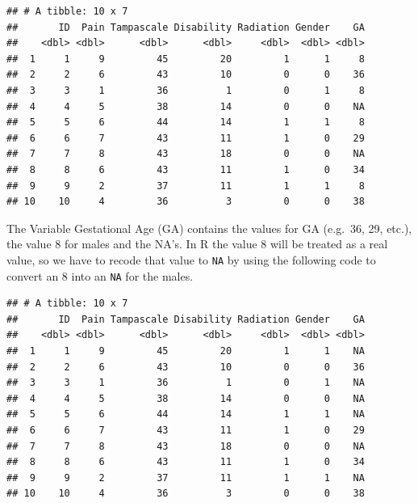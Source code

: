 \documentclass[]{book}
\newenvironment{Shaded}{\begin{snugshade}}{\end{snugshade}}
\newcommand{\KeywordTok}[1]{\textcolor[rgb]{0.13,0.29,0.53}{\textbf{#1}}}
\newcommand{\DecValTok}[1]{\textcolor[rgb]{0.00,0.00,0.81}{#1}}
\newcommand{\StringTok}[1]{\textcolor[rgb]{0.31,0.60,0.02}{#1}}
\newcommand{\OtherTok}[1]{\textcolor[rgb]{0.56,0.35,0.01}{#1}}
\newcommand{\OperatorTok}[1]{\textcolor[rgb]{0.81,0.36,0.00}{\textbf{#1}}}
\newcommand{\NormalTok}[1]{#1}
\begin{document}
\begin{verbatim}
## # A tibble: 10 x 7
##       ID  Pain Tampascale Disability Radiation Gender    GA
##    <dbl> <dbl>      <dbl>      <dbl>     <dbl>  <dbl> <dbl>
##  1     1     9         45         20         1      1     8
##  2     2     6         43         10         0      0    36
##  3     3     1         36          1         0      1     8
##  4     4     5         38         14         0      0    NA
##  5     5     6         44         14         1      1     8
##  6     6     7         43         11         1      0    29
##  7     7     8         43         18         0      0    NA
##  8     8     6         43         11         1      0    34
##  9     9     2         37         11         1      1     8
## 10    10     4         36          3         0      0    38
\end{verbatim}

The Variable Gestational Age (GA) contains the values for GA (e.g.~36,
29, etc.), the value 8 for males and the NA's. In R the value 8 will be
treated as a real value, so we have to recode that value to \texttt{NA}
by using the following code to convert an 8 into an \texttt{NA} for the
males.

\begin{Shaded}
\end{Shaded}

\begin{verbatim}
## # A tibble: 10 x 7
##       ID  Pain Tampascale Disability Radiation Gender    GA
##    <dbl> <dbl>      <dbl>      <dbl>     <dbl>  <dbl> <dbl>
##  1     1     9         45         20         1      1    NA
##  2     2     6         43         10         0      0    36
##  3     3     1         36          1         0      1    NA
##  4     4     5         38         14         0      0    NA
##  5     5     6         44         14         1      1    NA
##  6     6     7         43         11         1      0    29
##  7     7     8         43         18         0      0    NA
##  8     8     6         43         11         1      0    34
##  9     9     2         37         11         1      1    NA
## 10    10     4         36          3         0      0    38
\end{verbatim}
\end{document}
